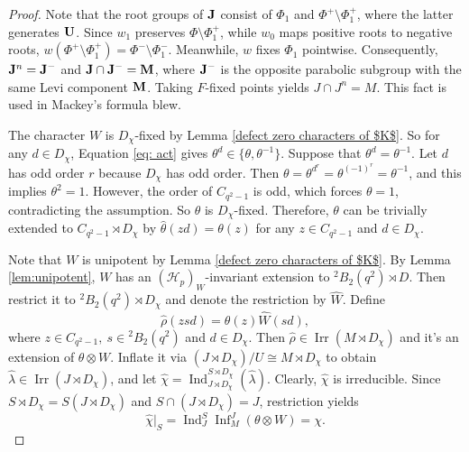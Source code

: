\documentclass[11pt,a4paper]{article}
\numberwithin{equation}{section}
\theoremstyle{definition}
\theoremstyle{remark}
\newcommand{\Irr}{\operatorname{Irr}}
\newcommand{\Inf}{\operatorname{Inf}}
\newcommand{\HH}{\mathcal H}
\newcommand{\Ind}{\operatorname{Ind}}
\begin{document}
\begin{proof}
Note that the root groups of $\bf J$ consist of  $\Phi_1$ and $\Phi^{+}\setminus\Phi_1^+$, where the latter generates ${\bf U}$. Since \(w_1\) preserves \(\Phi\setminus\Phi_1^+\), while \(w_0\) maps positive roots to negative roots, $w(\Phi^+\setminus\Phi_1^+) =\Phi^-\setminus\Phi_1^-$. Meanwhile, \(w\) fixes \(\Phi_1\) pointwise. Consequently, ${\bf J}^n=\bf J^-$ and $\bf J\cap\bf J^-=\bf M$, where \(\bf J^-\) is the opposite parabolic subgroup with the same Levi component $\bf M$. Taking \(F\)-fixed points yields $J\cap J^n=M$. This fact is used in Mackey's formula blew.

The character $W$ is $D_\chi$-fixed by Lemma \ref{defect zero characters of $K$}. So for any $d\in D_\chi$, Equation \eqref{eq: act} gives $\theta^d\in\{\theta,\theta^{-1}\}$. Suppose that $\theta^d=\theta^{-1}$.
Let $d$ has odd order $r$ because $D_\chi$ has odd order. Then $\theta=\theta^{d^r}=\theta^{(-1)^r}=\theta^{-1}$, and this implies $\theta^2=1$. However, the order of $C_{q^2-1}$ is odd, which forces $\theta=1$, contradicting the assumption. So $\theta$ is $D_\chi$-fixed. Therefore, \(\theta\) can be trivially extended to \(C_{q^2-1}\rtimes D_\chi\) by  $\widehat\theta(zd)=\theta(z)$ for any $z\in C_{q^2-1}$ and $d\in D_\chi$. 

Note that $W$ is unipotent by Lemma \ref{defect zero characters of $K$}. By Lemma \ref{lem:unipotent},   $W$ has 
an $(\HH_p)_W$-invariant extension to ${}^2B_2(q^2)\rtimes D$. Then restrict it to \({}^2B_2(q^2)\rtimes D_\chi\) and denote the restriction by \(\widehat W\). Define 
\[
\widehat\rho(zsd)=\theta(z)\widehat W(sd),
\]
where $z\in C_{q^2-1},\ s\in {}^2B_2(q^2)$ and $d\in D_\chi$.
Then  $\widehat\rho\in\Irr(M\rtimes D_\chi)$ and it's an extension of \(\theta\otimes W\). Inflate it via
$(J\rtimes D_\chi)/U\cong M\rtimes D_\chi$ to obtain \(\widehat\lambda\in\Irr(J\rtimes D_\chi)\), and let
$\widehat\chi=\Ind_{J\rtimes D_\chi}^{S\rtimes D_\chi}(\widehat\lambda)$. Clearly, $\widehat\chi$ is irreducible.
Since \(S\rtimes D_\chi=S(J\rtimes D_\chi)\) and \(S\cap (J\rtimes D_\chi)=J\), restriction yields
\[
\widehat\chi|_S=\Ind_J^S\Inf_M^J(\theta\otimes W)=\chi.
\]


\end{proof}
\end{document}
